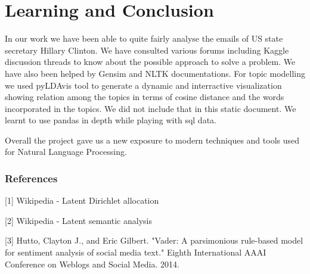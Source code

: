 \documentclass{article} %
\begin{document}
\section*{Learning and Conclusion}

In our work we have been able to quite fairly analyse the emails of US state secretary Hillary Clinton. We have consulted various forums including Kaggle discussion threads to know about the possible approach to solve a problem. We have also been helped by Gensim and NLTK documentations. For topic modelling we used pyLDAvis tool to generate a dynamic and interractive visualization showing relation among the topics in terms of cosine distance and the words incorporated in the topics. We did not include that in this static document. We learnt to use pandas in depth while playing with sql data.

Overall the project gave us a new exposure to modern techniques and tools used for Natural Language Processing.

\subsubsection*{References}

\small{
[1] Wikipedia - Latent Dirichlet allocation

[2] Wikipedia - Latent semantic analysis

[3] Hutto, Clayton J., and Eric Gilbert. "Vader: A parsimonious rule-based model for sentiment analysis of social media text." Eighth International AAAI Conference on Weblogs and Social Media. 2014.
}
\end{document}
